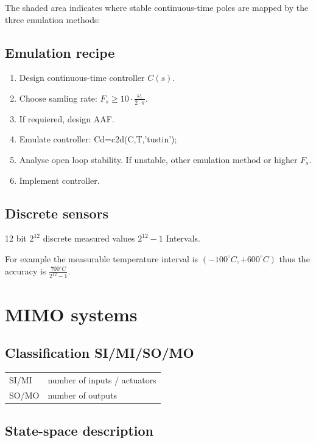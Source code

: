 \documentclass[10pt,a4paper]{scrartcl}
\begin{document}
\begin{multicols*}{3}
	The shaded area indicates where stable continuous-time poles  are mapped by the three emulation methods:
	
	
	\subsection*{Emulation recipe}
	
	\begin{enumerate}
	\compaq
	\item Design continuous-time controller $C(s)$.
	\item Choose samling rate: $F_s\geq 10\cdot \frac{\omega_c}{2\cdot \pi}$.
	\item If requiered, design AAF.
	\item Emulate controller: Cd=c2d(C,T,'tustin');
	\item Analyse open loop stability. If unstable, other emulation method or higher $F_s$.
	\item Implement controller.
	\end{enumerate}
	
	\subsection*{Discrete sensors}
	
	12 bit \dahe $2^{12}$ discrete measured values \dahe $2^{12}-1$ Intervals.
	
	For example the measurable temperature interval is $(-100^\circ C,+600^\circ C)$ thus the accuracy is $\frac{700^\circ C}{2^{12}-1}$.
	
	\section{MIMO systems}
	
	\subsection{Classification SI/MI/SO/MO}
	
	\begin{tabular}{l@{ \dahe }l}
	SI/MI&number of inputs / actuators\\
	SO/MO&number of outputs
	\end{tabular}
	
	\subsection{State-space description}
	

\end{multicols*}
\end{document}
